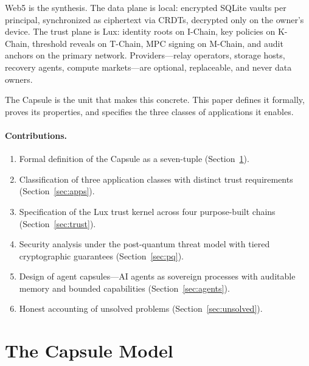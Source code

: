 \documentclass[11pt,a4paper]{article}
\begin{document}
Web5 is the synthesis. The data plane is local: encrypted SQLite vaults per
principal, synchronized as ciphertext via CRDTs, decrypted only on the owner's
device. The trust plane is Lux: identity roots on I-Chain, key policies on
K-Chain, threshold reveals on T-Chain, MPC signing on M-Chain, and audit anchors
on the primary network. Providers---relay operators, storage hosts, recovery
agents, compute markets---are optional, replaceable, and never data owners.

The Capsule is the unit that makes this concrete. This paper defines it formally,
proves its properties, and specifies the three classes of applications it enables.

\paragraph{Contributions.}
\begin{enumerate}[label=(\roman*),nosep]
  \item Formal definition of the Capsule as a seven-tuple (Section~\ref{sec:model}).
  \item Classification of three application classes with distinct trust requirements
        (Section~\ref{sec:apps}).
  \item Specification of the Lux trust kernel across four purpose-built chains
        (Section~\ref{sec:trust}).
  \item Security analysis under the post-quantum threat model with tiered
        cryptographic guarantees (Section~\ref{sec:pq}).
  \item Design of agent capsules---AI agents as sovereign processes with auditable
        memory and bounded capabilities (Section~\ref{sec:agents}).
  \item Honest accounting of unsolved problems (Section~\ref{sec:unsolved}).
\end{enumerate}

\section{The Capsule Model}\label{sec:model}
\end{document}
